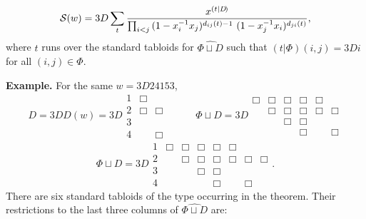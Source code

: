 \begin{thm} \mbox{} \\
$$
{\cal S}(w) =3D
\sum_{t}
{  x^{(t|D \! )}
  \over \prod_{i < j}\,
(1-x_i^{-1} x_j)^{d_{ij}(t)-1}\
(1-x_j^{-1} x_i)^{d_{ji}(t)}  },
$$
where $t$ runs over the standard tabloids for
$\widehat{\Phi \sqcup D}$ such that
$(t|\Phi)(i,j) =3D i$ for all $(i,j) \in \Phi$.
\end{thm}
{\bf Example.}  For the same $w =3D 24153$,
$$
D =3D D(w) =3D
\begin{array}{ccc}
1 & \Box &      \\
2 & \Box & \Box \\
3 &      &      \\
4 &      & \Box
\end{array}
\ \ \ \ \ \ \ \ \ \ \ \ \
\Phi \sqcup D =3D
\begin{array}{cccccc}
\Box & \Box & \Box & \Box & \Box &      \\
     & \Box & \Box & \Box & \Box & \Box \\
     &      & \Box & \Box &      &      \\
     &      &      & \Box &      & \Box
\end{array}
$$
$$
\widehat{\Phi \sqcup D} =3D
\begin{array}{cccccccc}
1 & \Box & \Box & \Box & \Box & \Box &       &       \\
2 &      & \Box & \Box & \Box & \Box &  \Box & \Box  \\
3 &      &      & \Box & \Box &      &       &       \\
4 &      &      &      & \Box &      &  \Box &
\end{array}.
$$
There are six standard
tabloids of the type occurring in the theorem.
Their restrictions to the last three columns of
$\widehat{\Phi \sqcup D}$ are:
